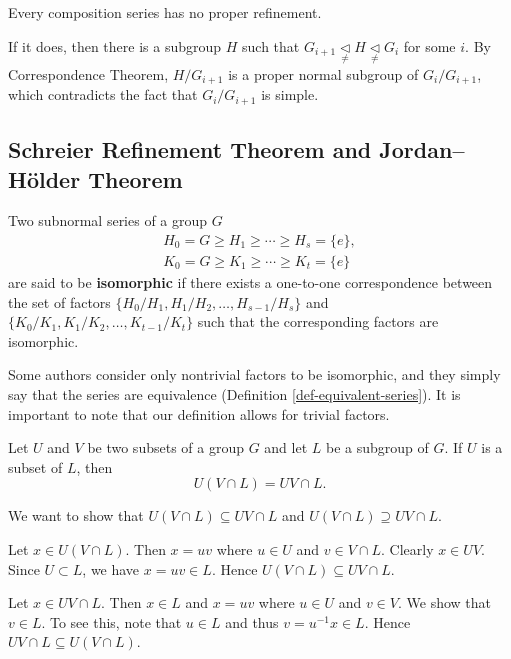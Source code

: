 \begin{proposition} \label{prop-composition-srs-has-no-proper-refinement}
	Every composition series has no proper refinement.
\end{proposition}
\begin{sketch}
	If it does, then there is a subgroup $H$ such that $G_{i+1}\underset{\neq}{\lhd} H \underset{\neq}{\lhd} G_i$ for some $i$. By Correspondence Theorem, $H/G_{i+1}$ is a proper normal subgroup of $G_{i}/G_{i+1}$, which contradicts the fact that $G_{i}/G_{i+1}$ is simple.
\end{sketch} 

\subsection{Schreier Refinement Theorem and Jordan--H\"older Theorem}
\begin{definition}
	Two subnormal series of a group $G$
	\begin{gather*}
		H_0 = G \geq H_1 \geq \cdots \geq H_s = \{e\},
		\\
		K_0 = G \geq K_1 \geq \cdots \geq K_t = \{e\}
	\end{gather*}
	are said to be \textbf{isomorphic} if there exists a one-to-one correspondence between the set of factors $\{H_0/H_1,H_1/H_2,\dots, H_{s-1}/H_s\}$ and $\{K_0/K_1,K_1/K_2,\dots, K_{t-1}/K_t\}$ such that the corresponding factors are isomorphic.
\end{definition}
\begin{remark}
	Some authors consider only nontrivial factors to be isomorphic, and they simply say that the series are equivalence (Definition \ref{def-equivalent-series}). It is important to note that our definition allows for trivial factors.
\end{remark}
\begin{lemma} \label{lemma-dedekind-law}
	Let $U$ and $V$ be two subsets of a group $G$ and let $L$ be a subgroup of $G$. If $U$ is a subset of $L$, then
	\begin{equation*}
		U(V\cap L) = UV \cap L.
	\end{equation*}
\end{lemma}
\begin{sketch}
	We want to show that $U(V\cap L) \subseteq UV \cap L$ and $U(V\cap L) \supseteq UV \cap L$.
	
	Let $x\in U(V\cap L)$. Then $x = uv$ where $u\in U$ and $v\in V\cap L$. Clearly $x\in UV$. Since $U\subset L$, we have $x = uv\in L$. Hence $U(V\cap L) \subseteq UV \cap L$.
	
	Let $x \in  UV \cap L$. Then $x\in L$ and $x = uv$ where $u\in U$ and $v\in V$. We show that $v\in L$. To see this, note that $u\in L$ and thus $v = u^{-1}x\in L$. Hence $UV \cap L  \subseteq U(V\cap L)$. 
\end{sketch}
